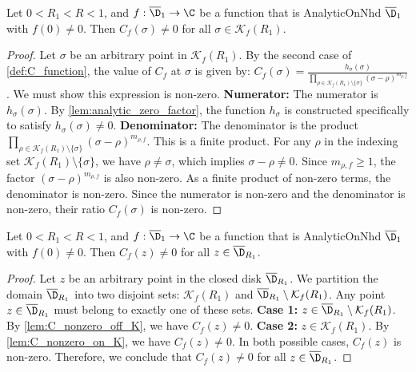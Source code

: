 \begin{lemma}[C nonzero on K]\label{lem:C_nonzero_on_K} \leanok {}
Let $0<R_1<R<1$, and $f:\overline{\D}_1\to\C$ be a function that is AnalyticOnNhd $\overline{\D}_1$ with $f(0)\neq0$. Then $C_f(\sigma)\neq0$ for all $\sigma \in \mathcal{K}_f(R_1)$.
\end{lemma}
\begin{proof}
\leanok
Let $\sigma$ be an arbitrary point in $\mathcal{K}_f(R_1)$.
By the second case of \cref{def:C_function}, the value of $C_f$ at $\sigma$ is given by:
$C_f(\sigma) = \frac{h_\sigma(\sigma)}{\prod_{\rho\in\mathcal{K}_f(R_1) \setminus\{\sigma\}}(\sigma-\rho)^{m_{\rho,f}}}$.
We must show this expression is non-zero.
\textbf{Numerator:} The numerator is $h_\sigma(\sigma)$. By \cref{lem:analytic_zero_factor}, the function $h_\sigma$ is constructed specifically to satisfy $h_\sigma(\sigma) \neq 0$.
\textbf{Denominator:} The denominator is the product $\prod_{\rho\in\mathcal{K}_f(R_1) \setminus\{\sigma\}}(\sigma-\rho)^{m_{\rho,f}}$. This is a finite product. For any $\rho$ in the indexing set $\mathcal{K}_f(R_1) \setminus\{\sigma\}$, we have $\rho \neq \sigma$, which implies $\sigma-\rho \neq 0$. Since $m_{\rho,f} \ge 1$, the factor $(\sigma-\rho)^{m_{\rho,f}}$ is also non-zero. As a finite product of non-zero terms, the denominator is non-zero.
Since the numerator is non-zero and the denominator is non-zero, their ratio $C_f(\sigma)$ is non-zero.
\end{proof}

\begin{lemma}\label{lem:C_never_zero} \leanok {}
Let $0<R_1<R<1$, and $f:\overline{\D}_1\to\C$ be a function that is AnalyticOnNhd $\overline{\D}_1$ with $f(0)\neq0$. Then $C_f(z)\neq0$ for all $z\in\overline{\D}_{R_1}$.
\end{lemma}
\begin{proof}
\leanok
Let $z$ be an arbitrary point in the closed disk $\overline{\D}_{R_1}$.
We partition the domain $\overline{\D}_{R_1}$ into two disjoint sets: $\mathcal{K}_f(R_1)$ and $\overline{\D}_{R_1} \setminus \mathcal{K}_f(R_1)$. Any point $z \in \overline{\D}_{R_1}$ must belong to exactly one of these sets.
\textbf{Case 1:} $z \in \overline{\D}_{R_1} \setminus \mathcal{K}_f(R_1)$.
By \cref{lem:C_nonzero_off_K}, we have $C_f(z) \neq 0$.
\textbf{Case 2:} $z \in \mathcal{K}_f(R_1)$.
By \cref{lem:C_nonzero_on_K}, we have $C_f(z) \neq 0$.
In both possible cases, $C_f(z)$ is non-zero. Therefore, we conclude that $C_f(z) \neq 0$ for all $z \in \overline{\D}_{R_1}$.
\end{proof}

